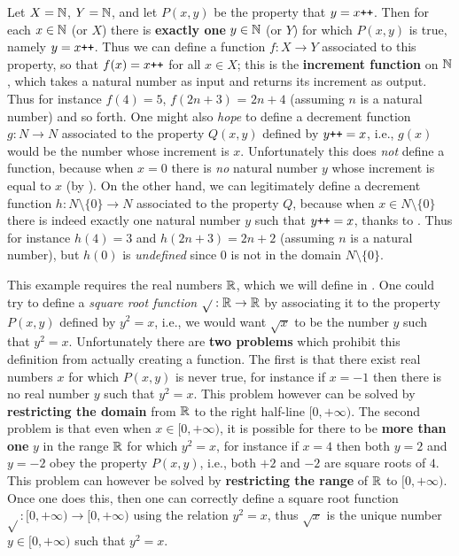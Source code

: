 \begin{example} \label{example 3.3.2}
Let \(X = \mathbb{N}\), \(Y = \mathbb{N}\), and let \(P(x, y)\) be the property that \(y = x\texttt{++}\). Then for each \(x \in \mathbb{N}\) (or \(X\)) there is \textbf{exactly one} \(y \in \mathbb{N}\) (or \(Y\)) for which \(P(x, y)\) is true, namely \(y = x\texttt{++}\). Thus we can define a function \(f : X \rightarrow Y\) associated to this property, so that \(f(x)= x\texttt{++}\) for all \(x \in X\); this is the \textbf{increment function} on \(\mathbb{N}\), which takes a natural number as input and returns its increment as output. Thus for instance \(f(4) = 5\), \(f(2n + 3)\) = \(2n + 4\) (assuming \(n\) is a natural number) and so forth. One might also \emph{hope} to define a decrement function \(g : N \rightarrow N\) associated to the property \(Q(x, y)\) defined by \(y\texttt{++} = x\), i.e., \(g(x)\) would be the number whose increment is \(x\). Unfortunately this does \emph{not} define a function, because when \(x = 0\) there is \emph{no} natural number \(y\) whose increment is equal to \(x\) (by ). On the other hand, we can legitimately define a decrement function \(h : N \setminus \{0\} \rightarrow N\) associated to the property \(Q\), because when \(x \in N \setminus \{0\}\) there is indeed exactly one natural number \(y\) such that \(y\texttt{++} = x\), thanks to . Thus for instance \(h(4) = 3\) and \(h(2n +3) = 2n + 2\) (assuming \(n\) is a natural number), but \(h(0)\) is \emph{undefined} since \(0\) is not in the domain \(N \setminus \{0\}\).
\end{example}

\begin{example} [Informal]
This example requires the real numbers \(\mathbb{R}\), which we will define in . One could try to define a \emph{square root function} \(\sqrt{} : \mathbb{R} \rightarrow \mathbb{R}\) by associating it to the property \(P(x, y)\) defined by \(y^2 = x\), i.e., we would want \(\sqrt{x}\) to be the number \(y\) such that \(y^2 = x\). Unfortunately there are \textbf{two problems} which prohibit this definition from actually creating a function. The first is that there exist real numbers \(x\) for which \(P(x, y)\) is never true, for instance if \(x = -1\) then there is no real number \(y\) such that \(y^2 = x\). This problem however can be solved by \textbf{restricting the domain} from \(\mathbb{R}\) to the right half-line \([0, +\infty)\). The second problem is that even when \(x \in [0, +\infty)\), it is possible for there to be \textbf{more than one} \(y\) in the range \(\mathbb{R}\) for which \(y^2 = x\), for instance if \(x = 4\) then both \(y = 2\) and \(y = -2\) obey the property \(P(x, y)\), i.e., both \(+2\) and \(-2\) are square roots of \(4\). This problem can however be solved by \textbf{restricting the range} of \(\mathbb{R}\) to \([0, +\infty)\). Once one does this, then one can correctly define a square root function \(\sqrt{} :[0, +\infty) \rightarrow [0, +\infty)\) using the relation \(y^2 = x\), thus \(\sqrt{x}\) is the unique number \(y \in [0, +\infty)\) such that \(y^2 = x\).
\end{example}

